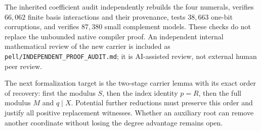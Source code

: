 The inherited coefficient audit independently rebuilds the four numerals,
verifies $66{,}062$ finite basis interactions and their provenance, tests
$38{,}663$ one-bit corruptions, and verifies $87{,}380$ small complement
models. These checks do not replace the unbounded native compiler proof.
An independent internal mathematical review of the new carrier is included
as \texttt{pell/INDEPENDENT\_PROOF\_AUDIT.md}; it is AI-assisted review,
not external human peer review.

The next formalization target is the two-stage carrier lemma with its exact
order of recovery: first the modulus $S$, then the index identity $p=R$,
then the full modulus $M$ and $q\mid X$. Potential further reductions must
preserve this order and justify all positive replacement witnesses.
Whether an auxiliary root can remove another coordinate without losing
the degree advantage remains open.
